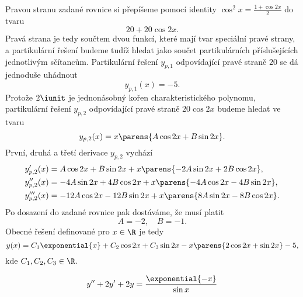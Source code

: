 \documentclass[answers]{exam}
\begin{document}
\begin{questions}
\begin{solution}
  	Pravou stranu zadané rovnice si přepíšeme pomocí identity $\cos^2 x = \frac{1 + \cos 2x}{2}$ do tvaru
  	\begin{equation*}
  		20 + 20 \cos 2x.
  	\end{equation*}
  	Pravá strana je tedy součtem dvou funkcí, které mají tvar speciální pravé strany, a partikulární řešení budeme tudíž hledat jako součet partikulárních příslušejících jednotlivým sčítancům. Partikulární řešení $y_{p, 1}$ odpovídající pravé straně $20$ se dá jednoduše uhádnout
  	\begin{equation*}
  		y_{p, 1}(x) = -5.
  	\end{equation*}
  	Protože $2\iunit$ je jednonásobný kořen charakteristického polynomu, partikulární řešení $y_{p, 2}$ odpovídající pravé straně $20 \cos 2x$ budeme hledat ve tvaru
  	\begin{equation*}
  	 y_{p, 2}(x)
  	 =
  	 x \parens{A \cos 2x + B \sin 2x}.
  	\end{equation*}
  	První, druhá a třetí derivace $y_{p, 2}$ vychází
  	\begin{align*}
  		y_{p, 2}'(x) &= A \cos 2x + B \sin 2x + x \parens{-2 A \sin 2x + 2 B \cos 2x},
  		\\
  		y_{p, 2}''(x) &= - 4 A \sin 2x + 4 B \cos 2x + x \parens{- 4 A \cos 2x - 4 B \sin 2x},
  		\\
  		y_{p, 2}'''(x) &= - 12 A \cos 2x - 12 B \sin 2x + x \parens{8 A \sin 2x - 8 B \cos 2x}.
   	\end{align*}
  	Po dosazení do zadané rovnice pak dostáváme, že musí platit
  	\begin{equation*}
  		A = -2, \quad B = -1.
  	\end{equation*}
  	Obecné řešení definované pro $x \in \R$ je tedy
  	\begin{equation*}
  		y(x) = C_1 \exponential{x} + C_2 \cos 2x + C_3 \sin 2x - x \parens{2 \cos 2x + \sin 2x} - 5, 
  	\end{equation*}
  	kde $C_1, C_2, C_3 \in \R$.
  \end{solution}

  \question
  \begin{equation*}
    y'' + 2y' + 2y = \frac{\exponential{-x}}{\sin x}
  \end{equation*}
  

\end{questions}
\end{document}
